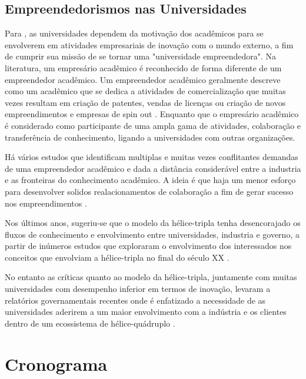 \documentclass[12pt]{article}
\begin{document}
\subsection{Empreendedorismos nas Universidades}
Para \cite{etzkowitz2002networks}, as universidades dependem da motivação dos acadêmicos para se envolverem em atividades empresariais de inovação com o mundo externo, a fim de cumprir sua missão de se tornar uma "universidade empreendedora". Na literatura, um empresário acadêmico é reconhecido de forma diferente de um empreendedor acadêmico. Um empreendedor acadêmico geralmente descreve como um acadêmico que se dedica a atividades de comercialização que muitas vezes resultam em criação de patentes, vendas de licenças ou criação de novos empreendimentos e empresas de spin out \cite{jensen2001proofs}. Enquanto que o empresário acadêmico é considerado como participante de uma ampla gama de atividades, colaboração e transferência de conhecimento, ligando a universidades com outras organizações.

Há vários estudos que identificam multiplas e muitas vezes conflitantes demandas de uma empreendedor acadêmico e dada a distância considerável entre a industria e as fronteiras do conhecimento acadêmico. A ideia é que haja um menor esforço para desenvolver solidos realacionamentos de colaboração a fim de gerar sucesso nos empreendimentos \cite{rothaermel2007university}.

Nos últimos anos, sugeriu-se que o modelo da hélice-tripla tenha desencorajado os fluxos de conhecimento e envolvimento entre universidades, industria e governo, a partir de inúmeros estudos que exploraram o envolvimento dos interessados nos conceitos que envolviam a hélice-tripla no final do século XX \cite{sperrer2016concept}. 

No entanto as críticas quanto ao modelo da hélice-tripla, juntamente com muitas universidades com desempenho inferior em termos de inovação, levaram a relatórios governamentais recentes onde é enfatizado a necessidade de as universidades aderirem a um maior envolvimento com a indústria e os clientes dentro de um ecossistema de hélice-quádruplo \cite{witty2013encouraging}.

\section{Cronograma} \label{sec:Crono}
\end{document}
